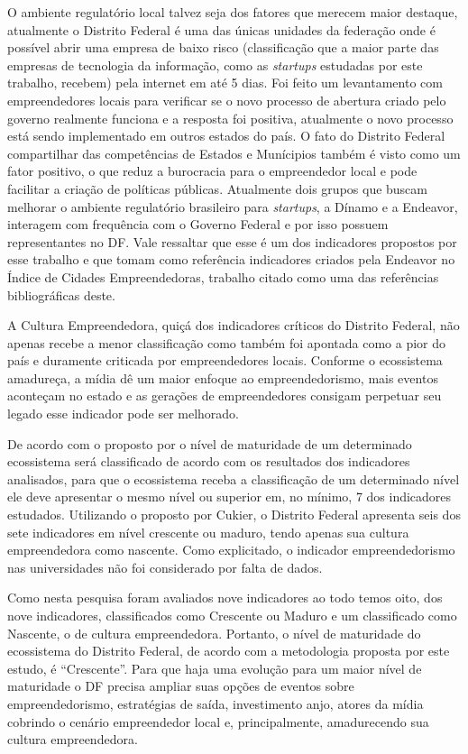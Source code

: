 O ambiente regulatório local talvez seja dos fatores que merecem maior destaque, atualmente o Distrito Federal é uma das únicas unidades da federação onde é possível abrir uma empresa de baixo risco (classificação que a maior parte das empresas de tecnologia da informação, como as \textit{startups} estudadas por este trabalho, recebem) pela internet em até 5 dias. Foi feito um levantamento com empreendedores locais para verificar se o novo processo de abertura criado pelo governo realmente funciona e a resposta foi positiva, atualmente o novo processo está sendo implementado em outros estados do país. O fato do Distrito Federal compartilhar das competências de Estados e Munícipios também é visto como um fator positivo, o que reduz a burocracia para o empreendedor local e pode facilitar a criação de políticas públicas. Atualmente dois grupos que buscam melhorar o ambiente regulatório brasileiro para \textit{startups}, a Dínamo e a Endeavor, interagem com frequência com o Governo Federal e por isso possuem representantes no DF. Vale ressaltar que esse é um dos indicadores propostos por esse trabalho e que tomam como referência indicadores criados pela Endeavor no Índice de Cidades Empreendedoras, trabalho citado como uma das referências bibliográficas deste.

A Cultura Empreendedora, quiçá dos indicadores críticos do Distrito Federal, não apenas recebe a menor classificação como também foi apontada como a pior do país e duramente criticada por empreendedores locais. Conforme o ecossistema amadureça, a mídia dê um maior enfoque ao empreendedorismo, mais eventos aconteçam no estado e as gerações de empreendedores consigam perpetuar seu legado esse indicador pode ser melhorado.

De acordo com o proposto por  o nível de maturidade de um determinado ecossistema será classificado de acordo com os resultados dos indicadores analisados, para que o ecossistema receba a classificação de um determinado nível ele deve apresentar o mesmo nível ou superior em, no mínimo, 7 dos indicadores estudados. Utilizando o proposto por Cukier, o Distrito Federal apresenta seis dos sete indicadores em nível crescente ou maduro, tendo apenas sua cultura empreendedora como nascente. Como explicitado, o indicador 
empreendedorismo nas universidades não foi considerado por falta de dados. 

Como nesta pesquisa foram avaliados nove indicadores ao todo temos oito, dos nove indicadores, classificados como Crescente ou Maduro e um classificado como Nascente, o de cultura empreendedora. Portanto, o nível de maturidade do ecossistema do Distrito Federal, de acordo com a metodologia proposta por este estudo, é ``Crescente''. Para que haja uma evolução para um maior nível de maturidade o DF precisa ampliar suas opções de eventos sobre empreendedorismo, estratégias de saída, investimento anjo, atores da mídia cobrindo o cenário empreendedor local e, principalmente, amadurecendo sua cultura empreendedora.

